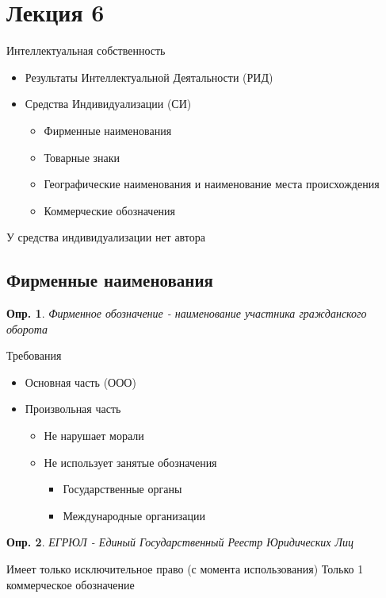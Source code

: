 \documentclass[12pt]{article}
\newtheorem{definition}{Опр.}
\begin{document}
\section{Лекция 6}

Интеллектуальная собственность
\begin{itemize}
  \item Результаты Интеллектуальной Деятальности (РИД)
  \item Средства Индивидуализации (СИ) 
  \begin{itemize}
    \item Фирменные наименования
    \item Товарные знаки
    \item Географические наименования и наименование места происхождения
    \item Коммерческие обозначения
  \end{itemize}
\end{itemize}

У средства индивидуализации нет автора

\subsection{Фирменные наименования}

\begin{definition}
  Фирменное обозначение - наименование участника гражданского оборота
\end{definition}
Требования
\begin{itemize}
  \item Основная часть (ООО)
  \item Произвольная часть
  \begin{itemize}
  \item Не нарушает морали
  \item Не использует занятые обозначения
  \begin{itemize}
    \item Государственные органы
    \item Международные организации
  \end{itemize}  
\end{itemize}
\end{itemize}

\begin{definition}
  ЕГРЮЛ - Единый Государственный Реестр Юридических Лиц
\end{definition}

Имеет только исключительное право (с момента использования)
Только 1 коммерческое обозначение
\end{document}
